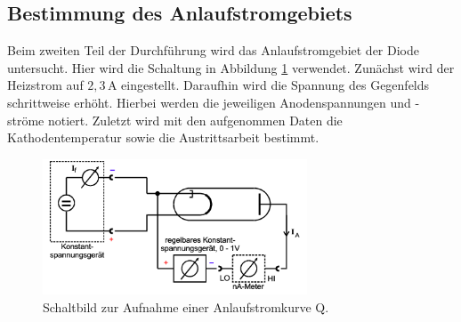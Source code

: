 \subsection{Bestimmung des Anlaufstromgebiets}
Beim zweiten Teil der Durchführung wird das Anlaufstromgebiet der Diode untersucht. Hier wird die 
Schaltung in Abbildung \ref{fig:zweiteApparatur} verwendet. Zunächst wird der Heizstrom auf $2,3\,\unit{\ampere}$
eingestellt. Daraufhin wird die Spannung des Gegenfelds schrittweise erhöht. Hierbei werden die jeweiligen Anodenspannungen
und -ströme notiert. Zuletzt wird mit den aufgenommen Daten die Kathodentemperatur sowie die Austrittsarbeit bestimmt.
\begin{figure}[H]
    \centering
    \includegraphics[width=0.7\textwidth]{content/Bilder/zweiterAufbau.png}
    \caption{Schaltbild zur Aufnahme einer Anlaufstromkurve Q\cite{anleitungV504}.}
    \label{fig:zweiteApparatur}
\end{figure}
